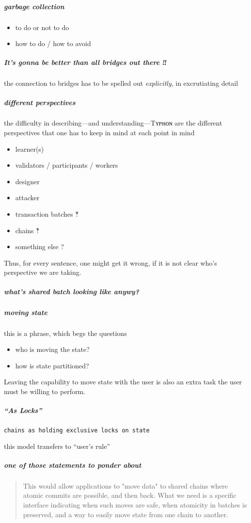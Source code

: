 \documentclass{article}
\theoremstyle{definition}
\begin{document}
\subparagraph{garbage collection}
\begin{itemize}
\item to do or not to do
\item how to do / how to avoid 
\end{itemize}

\subparagraph{It's gonna be better than all bridges out there ‼}
the connection to bridges has to be spelled out \emph{explicitly},
in excrutiating detail

\subparagraph{different perspectives}
the difficulty in describing---and understanding---Tʏᴘʜᴏɴ
are the different perspectives that one has to keep in mind at each point in mind
\begin{itemize}
\item learner(s)
\item validators / participants / workers
\item designer
\item attacker
\item transaction batches ‽
\item chains ‽
\item something else ?
\end{itemize}
Thus, for every sentence, 
one might get it wrong,
if it is not clear who's perspective we are taking. 


\subparagraph{what's shared batch looking like anywy?}

\subparagraph{moving state}
this is a phrase, 
which begs the questions
\begin{itemize}
\item who is moving the state?
\item how is state partitioned?
\end{itemize}

Leaving the capability to move state with the user
is also an extra task the user must be willing to perform. 

\subparagraph{“As Locks”}

\texttt{chains as holding exclusive locks on state}

this model transfers to “user's rule”





\subparagraph{one of those statements to ponder about}

\begin{quote}
  This would allow applications to "move data" to shared chains where atomic commits are possible, and then back. What we need is a specific interface indicating when such moves are safe, when atomicity in batches is preserved, and a way to easily move state from one chain to another.
\end{quote}
\end{document}

